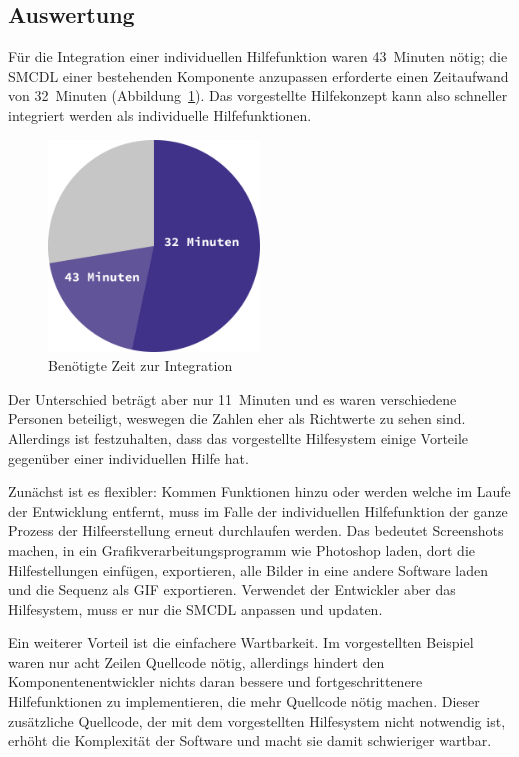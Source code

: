 \documentclass[
	headsepline,
	footsepline,
	fontsize=12pt,
	bibliography=totoc
]{scrbook}
\begin{document}
\subsection{Auswertung}
\label{section:evaluation:entwicklungsaufwand:auswertung}

Für die Integration einer individuellen Hilfefunktion waren 43~Minuten nötig; die SMCDL einer bestehenden Komponente anzupassen erforderte einen Zeitaufwand von 32~Minuten (Abbildung~\ref{figure:zeit}). Das vorgestellte Hilfekonzept kann also schneller integriert werden als individuelle Hilfefunktionen.

\begin{figure}[htbp]
   \centering
   \includegraphics[width=0.5\textwidth]{images/evaluation-zeit.png}
   \caption{Benötigte Zeit zur Integration}
   \label{figure:zeit}
\end{figure}

Der Unterschied beträgt aber nur 11~Minuten und es waren verschiedene Personen beteiligt, weswegen die Zahlen eher als Richtwerte zu sehen sind. Allerdings ist festzuhalten, dass das vorgestellte Hilfesystem einige Vorteile gegenüber einer individuellen Hilfe hat.

Zunächst ist es flexibler: Kommen Funktionen hinzu oder werden welche im Laufe der Entwicklung entfernt, muss im Falle der individuellen Hilfefunktion der ganze Prozess der Hilfeerstellung erneut durchlaufen werden. Das bedeutet Screenshots machen, in ein Grafikverarbeitungsprogramm wie Photoshop laden, dort die Hilfestellungen einfügen, exportieren, alle Bilder in eine andere Software laden und die Sequenz als GIF exportieren. Verwendet der Entwickler aber das Hilfesystem, muss er nur die SMCDL anpassen und updaten.

Ein weiterer Vorteil ist die einfachere Wartbarkeit. Im vorgestellten Beispiel waren nur acht Zeilen Quellcode nötig, allerdings hindert den Komponentenentwickler nichts daran bessere und fortgeschrittenere Hilfefunktionen zu implementieren, die mehr Quellcode nötig machen. Dieser zusätzliche Quellcode, der mit dem vorgestellten Hilfesystem nicht notwendig ist, erhöht die Komplexität der Software und macht sie damit schwieriger wartbar.
\end{document}
